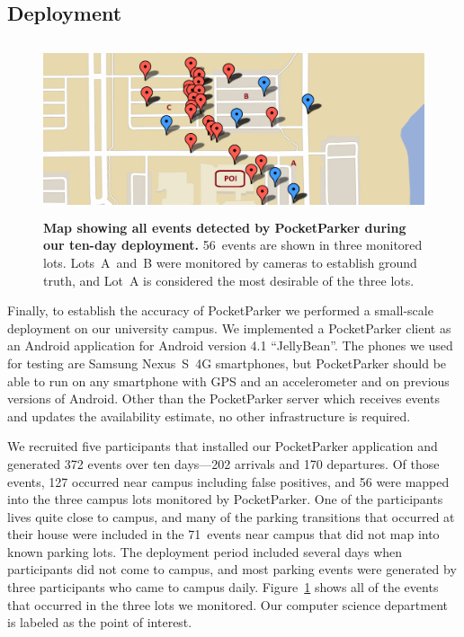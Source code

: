 \subsection{Deployment}

\begin{figure}
\centering
\includegraphics[width=\textwidth,height=2in]{./figures/detectedEventsOnMap.pdf}

\caption{\textbf{Map showing all events detected by PocketParker during our
ten-day deployment.} 56~events are shown in three monitored lots.
Lots~A~and~B were monitored by cameras to establish ground truth, and Lot~A
is considered the most desirable of the three lots.}

\label{fig-events}
\end{figure}

Finally, to establish the accuracy of PocketParker we performed a small-scale
deployment on our university campus. We implemented a PocketParker client as
an Android application for Android version 4.1 ``JellyBean''. The phones we
used for testing are Samsung Nexus~S~4G smartphones, but PocketParker should
be able to run on any smartphone with GPS and an accelerometer and on
previous versions of Android. Other than the PocketParker server which
receives events and updates the availability estimate, no other
infrastructure is required.

We recruited five participants that installed our PocketParker application
and generated 372 events over ten days---202 arrivals and 170 departures. Of
those events, 127 occurred near campus including false positives, and 56 were
mapped into the three campus lots monitored by PocketParker. One of the
participants lives quite close to campus, and many of the parking transitions
that occurred at their house were included in the 71~events near campus that
did not map into known parking lots. The deployment period included several
days when participants did not come to campus, and most parking events were
generated by three participants who came to campus daily.
Figure~\ref{fig-events} shows all of the events that occurred in the three
lots we monitored. Our computer science department is labeled as the point of
interest.

